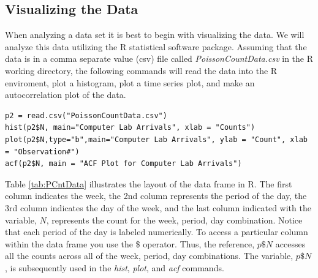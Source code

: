 \documentclass[
]{book}
\theoremstyle{definition}
\theoremstyle{definition}
\theoremstyle{definition}
\theoremstyle{definition}
\theoremstyle{remark}
\begin{document}
\hypertarget{visualizing-the-data}{%
\subsection{Visualizing the Data}\label{visualizing-the-data}}

When analyzing a data set it is best to begin with visualizing the data.
We will analyze this data utilizing the R statistical software package.
Assuming that the data is in a comma separate value (csv) file called
\emph{PoissonCountData.csv} in the R working directory, the following
commands will read the data into the R enviroment, plot a histogram,
plot a time series plot, and make an autocorrelation plot of the data.

\begin{verbatim}
p2 = read.csv("PoissonCountData.csv")
hist(p2$N, main="Computer Lab Arrivals", xlab = "Counts")
plot(p2$N,type="b",main="Computer Lab Arrivals", ylab = "Count", xlab = "Observation#")
acf(p2$N, main = "ACF Plot for Computer Lab Arrivals")
\end{verbatim}

Table \ref{tab:PCntData} illustrates the layout of the
data frame in R. The first column indicates the week, the 2nd column
represents the period of the day, the 3rd column indicates the day of
the week, and the last column indicated with the variable, \(N\),
represents the count for the week, period, day combination. Notice that each period of the day is labeled numerically. To access a
particular column within the data frame you use the \$ operator. Thus,
the reference, \(p\$N\) accesses all the counts across all of the week,
period, day combinations. The variable, \(p\$N\), is subsequently used in
the \emph{hist}, \emph{plot}, and \emph{acf} commands.
\end{document}
